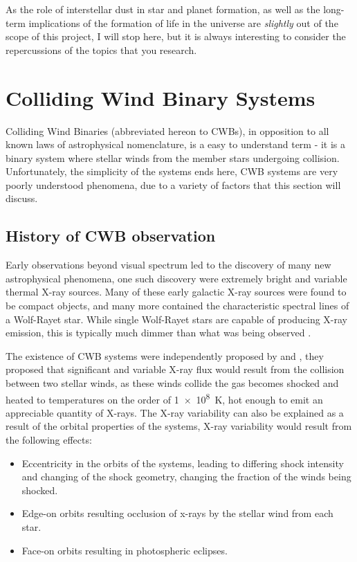 As the role of interstellar dust in star and planet formation, as well as the long-term implications of the formation of life in the universe are \textit{slightly} out of the scope of this project, I will stop here, but it is always interesting to consider the repercussions of the topics that you research.

\section{Colliding Wind Binary Systems}
\label{sec:cwb}

Colliding Wind Binaries (abbreviated hereon to CWBs), in opposition to all known laws of astrophysical nomenclature, is a easy to understand term - it is a binary system where stellar winds from the member stars undergoing collision.
Unfortunately, the simplicity of the systems ends here, CWB systems are very poorly understood phenomena, due to a variety of factors that this section will discuss.

\subsection{History of CWB observation}


Early observations beyond visual spectrum led to the discovery of many new astrophysical phenomena, one such discovery were extremely bright and variable thermal X-ray sources.
Many of these early galactic X-ray sources were found to be compact objects, and many more contained the characteristic spectral lines of a Wolf-Rayet star.
While single Wolf-Rayet stars are capable of producing X-ray emission, this is typically much dimmer than what was being observed 
\parencite{sewardXraysEtaCarinae1979}.

The existence of CWB systems were independently proposed by \textcite{prilutskii_x_1976} and \textcite{cherepashchukDetectabilityWolfRayetBinaries1976}, 
they proposed that significant and variable X-ray flux would result from the collision between two stellar winds, as these winds collide the gas becomes shocked and heated to temperatures on the order of \SI{1e8}{\kelvin}, hot enough to emit an appreciable quantity of X-rays.
The X-ray variability can also be explained as a result of the orbital properties of the systems, X-ray variability would result from the following effects:
\begin{itemize}
  \item Eccentricity in the orbits of the systems, leading to differing shock intensity and changing of the shock geometry, changing the fraction of the winds being shocked.
  \item Edge-on orbits resulting occlusion of x-rays by the stellar wind from each star. 
  \item Face-on orbits resulting in photospheric eclipses.
\end{itemize}

